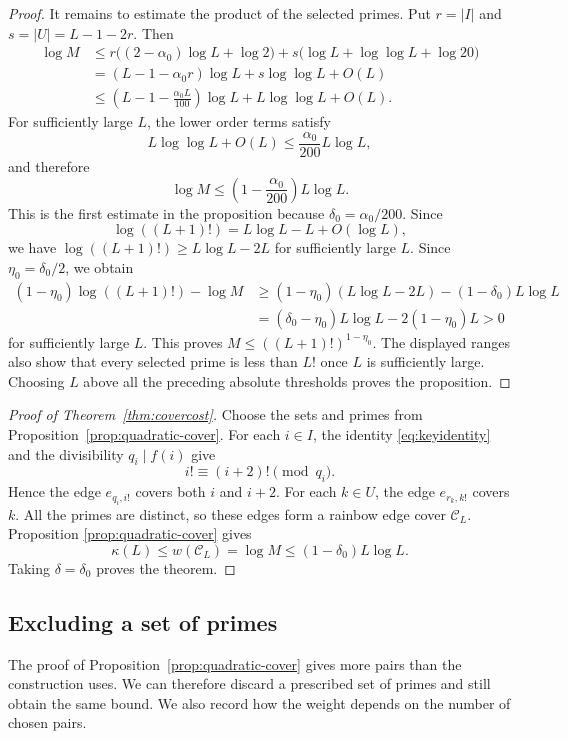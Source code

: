 \documentclass[11pt]{amsart}
\theoremstyle{definition}
\theoremstyle{remark}
\begin{document}
\begin{proof}
It remains to estimate the product of the selected primes.  Put $r=|I|$ and
$s=|U|=L-1-2r$.  Then
\begin{align*}
\log M
&\leq
r\bigl((2-\alpha_0)\log L+\log2\bigr)
+s\bigl(\log L+\log\log L+\log20\bigr)\\
&=(L-1-\alpha_0r)\log L+s\log\log L+O(L)\\
&\leq
\left(L-1-\frac{\alpha_0L}{100}\right)\log L
+L\log\log L+O(L).
\end{align*}
For sufficiently large $L$, the lower order terms satisfy
\[
L\log\log L+O(L)
\leq\frac{\alpha_0}{200}L\log L,
\]
and therefore
\[
\log M
\leq
\left(1-\frac{\alpha_0}{200}\right)L\log L.
\]
This is the first estimate in the proposition because
$\delta_0=\alpha_0/200$.
Since
\[
\log((L+1)!)=L\log L-L+O(\log L),
\]
we have $\log((L+1)!)\geq L\log L-2L$ for sufficiently large $L$.  Since
$\eta_0=\delta_0/2$, we obtain
\begin{align*}
(1-\eta_0)\log((L+1)!)-\log M
&\geq
(1-\eta_0)(L\log L-2L)-(1-\delta_0)L\log L\\
&=(\delta_0-\eta_0)L\log L-2(1-\eta_0)L>0
\end{align*}
for sufficiently large $L$.  This proves
$M\leq((L+1)!)^{1-\eta_0}$.  The displayed ranges also show that every
selected prime is less than $L!$ once $L$ is sufficiently large.
Choosing $L$ above all the preceding absolute thresholds proves the
proposition.
\end{proof}

\begin{proof}[Proof of Theorem~\ref{thm:covercost}]
Choose the sets and primes from Proposition~\ref{prop:quadratic-cover}.  For
each $i\in I$, the identity \eqref{eq:keyidentity} and the divisibility
$q_i\mid f(i)$ give
\[
i!\equiv(i+2)!\pmod{q_i}.
\]
Hence the edge $e_{q_i,i!}$ covers both $i$ and $i+2$.  For each $k\in U$,
the edge $e_{r_k,k!}$ covers $k$.  All the primes are distinct, so these
edges form a rainbow edge cover $\mathcal C_L$.  Proposition
\ref{prop:quadratic-cover} gives
\[
\kappa(L)\leq w(\mathcal C_L)
=\log M\leq(1-\delta_0)L\log L.
\]
Taking $\delta=\delta_0$ proves the theorem.
\end{proof}


\subsection{Excluding a set of primes}
The proof of Proposition~\ref{prop:quadratic-cover} gives more pairs
than the construction uses. We can therefore discard a prescribed set
of primes and still obtain the same bound. We also record how the
weight depends on the number of chosen pairs.
\end{document}
